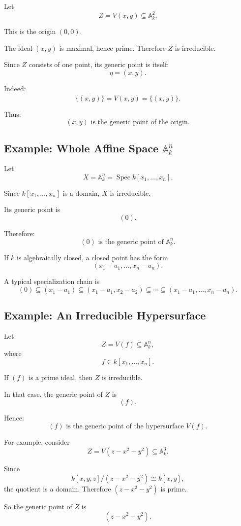 \documentclass[12pt,a4paper]{article}
\theoremstyle{notespace}
\begin{document}
Let
\[
Z=V(x,y)\subseteq \mathbb A^2_k.
\]

This is the origin \((0,0)\).

The ideal \((x,y)\) is maximal, hence prime. Therefore \(Z\) is irreducible.

Since \(Z\) consists of one point, its generic point is itself:
\[
\eta=(x,y).
\]

Indeed:
\[
\overline{\{(x,y)\}}=V(x,y)=\{(x,y)\}.
\]

Thus:
\[
\boxed{
	(x,y)\text{ is the generic point of the origin.}
}
\]

\subsection{Example: Whole Affine Space \(\mathbb A^n_k\)}

Let
\[
X=\mathbb A^n_k=\operatorname{Spec} k[x_1,\dots,x_n].
\]

Since \(k[x_1,\dots,x_n]\) is a domain, \(X\) is irreducible.

Its generic point is
\[
(0).
\]

Therefore:
\[
\boxed{
	(0)\text{ is the generic point of }\mathbb A^n_k.
}
\]

If \(k\) is algebraically closed, a closed point has the form
\[
(x_1-a_1,\dots,x_n-a_n).
\]

A typical specialization chain is
\[
(0)
\subseteq
(x_1-a_1)
\subseteq
(x_1-a_1,x_2-a_2)
\subseteq
\cdots
\subseteq
(x_1-a_1,\dots,x_n-a_n).
\]

\subsection{Example: An Irreducible Hypersurface}

Let
\[
Z=V(f)\subseteq \mathbb A^n_k,
\]
where
\[
f\in k[x_1,\dots,x_n].
\]

If \((f)\) is a prime ideal, then \(Z\) is irreducible.

In that case, the generic point of \(Z\) is
\[
(f).
\]

Hence:
\[
\boxed{
	(f)\text{ is the generic point of the hypersurface }V(f).
}
\]

For example, consider
\[
Z=V(z-x^2-y^2)\subseteq \mathbb A^3_k.
\]

Since
\[
k[x,y,z]/(z-x^2-y^2)\cong k[x,y],
\]
the quotient is a domain. Therefore \((z-x^2-y^2)\) is prime.

So the generic point of \(Z\) is
\[
(z-x^2-y^2).
\]
\end{document}
